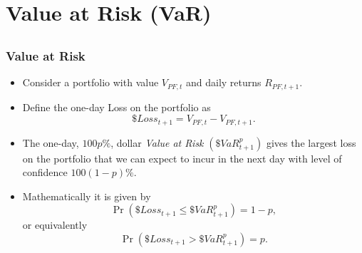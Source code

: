 

\frame{\titlepage}



\section[VaR]{Value at Risk (VaR)}\subsection*{}

\begin{frame}%

\frametitle{Value at Risk}

\begin{itemize}
\item Consider a portfolio with value $V_{PF,t}$ and daily returns $%
R_{PF,t+1}$.

\item Define the one-day Loss on the portfolio as%
\begin{equation*}
\$Loss_{t+1}=V_{PF,t}-V_{PF,t+1}.
\end{equation*}

\item The one-day, $100p\%$, dollar \emph{\color{red}Value at Risk }$%
(\$VaR_{t+1}^{p})$ gives the largest loss on the portfolio that we can
expect to incur in the next day with level of confidence $100\left(
1-p\right) \%.$

\item Mathematically it is given by%
\begin{equation*}
\Pr (\$Loss_{t+1}\leq \$VaR_{t+1}^{p})=1-p,
\end{equation*}%
or equivalently
\begin{equation*}
\Pr (\$Loss_{t+1}>\$VaR_{t+1}^{p})=p.
\end{equation*}
\end{itemize}

\end{frame}%

